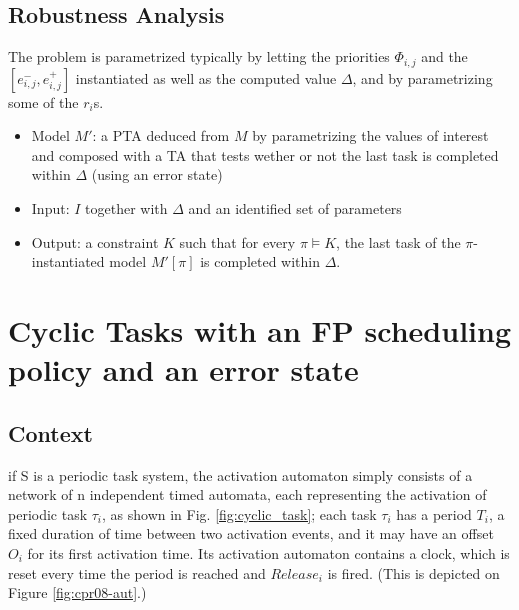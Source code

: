 \documentclass{article}
\begin{document}
\subsection{Robustness Analysis}
The problem is parametrized typically by letting the priorities $\Phi_{i,j}$ and the $[e^{-}_{i,j},e^{+}_{i,j}]$ instantiated as well as the computed value $\Delta$, and by parametrizing some of the $r_i$s.

\begin{itemize}
 \item Model $M'$: a PTA deduced from $M$ by parametrizing the values of interest and composed with a TA that tests wether or not the last task is completed within $\Delta$ (using an error state)
 \item Input: $I$ together with $\Delta$ and an identified set of parameters 
 \item Output: a constraint $K$ such that for every $\pi \models K$, the last task of the $\pi$-instantiated model $M'[\pi]$ is completed within $\Delta$.

\end{itemize}



% 
% 

\section{Cyclic Tasks with an FP scheduling policy and an error state \cite{cpr08,lpprc10}}
\label{sec:cpr08}
\subsection{Context}
if S is a periodic
task system, the activation automaton simply consists of a
network of n independent timed automata, each representing
the activation of periodic task $\tau_i$, as shown in Fig. \ref{fig:cyclic_task}; each task $\tau_i$ has a period $T_i$, a fixed duration of time between
two activation events, and it may have an offset $O_i$ for its first activation time. Its activation automaton contains
a clock, which is reset every time the period is reached
and $Release_i$ is fired. (This is depicted on Figure \ref{fig:cpr08-aut}.)
\end{document}
